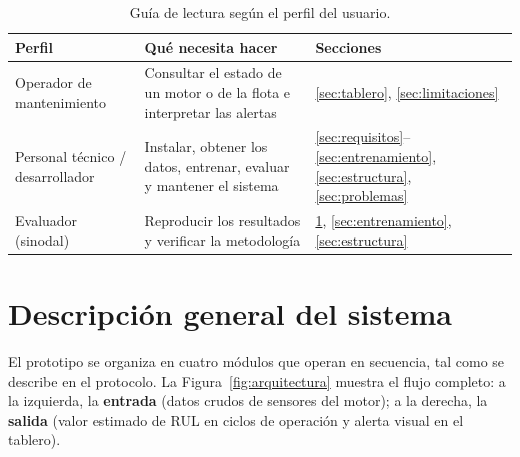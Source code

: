 \documentclass[letterpaper]{article}
\newcommand{\encabezadotabla}{\rowcolor{red!20}}
\newcommand{\filatabla}{\rowcolor{colorOtros}}
\begin{document}
\begin{table}[H]
\centering
\fontsize{9}{11}\selectfont
\caption{Guía de lectura según el perfil del usuario.}
\label{tab:guia}
\renewcommand{\arraystretch}{1.5}
\begin{tabularx}{\textwidth}{|>{\raggedright\arraybackslash}p{4.3cm}|X|>{\raggedright\arraybackslash}p{3cm}|}
    \hline
    \encabezadotabla \textbf{Perfil} & \textbf{Qué necesita hacer} & \textbf{Secciones} \\
    \hline
    \filatabla Operador de mantenimiento & Consultar el estado de un motor o de la flota e interpretar las alertas & \ref{sec:tablero}, \ref{sec:limitaciones} \\
    \hline
    \filatabla Personal técnico / desarrollador & Instalar, obtener los datos, entrenar, evaluar y mantener el sistema & \ref{sec:requisitos}--\ref{sec:entrenamiento}, \ref{sec:estructura}, \ref{sec:problemas} \\
    \hline
    \filatabla Evaluador (sinodal) & Reproducir los resultados y verificar la metodología & \ref{sec:descripcion}, \ref{sec:entrenamiento}, \ref{sec:estructura} \\
    \hline
\end{tabularx}
\end{table}

\section{Descripción general del sistema}
\label{sec:descripcion}

El prototipo se organiza en cuatro módulos que operan en secuencia, tal como se
describe en el protocolo. La Figura~\ref{fig:arquitectura} muestra el flujo
completo: a la izquierda, la \textbf{entrada} (datos crudos de sensores del
motor); a la derecha, la \textbf{salida} (valor estimado de RUL en ciclos de
operación y alerta visual en el tablero).
\end{document}
